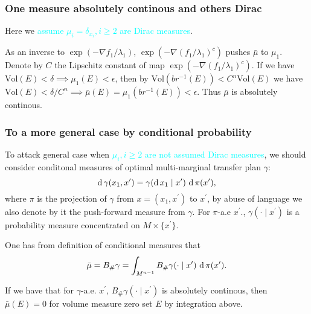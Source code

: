 \subsubsection{One measure absolutely continous and others Dirac}
Here we \textcolor{cyan}{assume $\mu_i = \delta_{x_i}, i \geq 2$ are Dirac measures}.

As an inverse to $\exp(-\nabla f_1/\lambda_1)$,
\(\exp(-\nabla(f_1/\lambda_1)^c)\) pushes $\bar{\mu}$ to $\mu_1$.
Denote by $C$ the Lipschitz constant of map \(\exp(-\nabla(f_1/\lambda_1)^c)\).
If we have $ \text{Vol}(E) < \delta \implies \mu_1(E) < \epsilon$,
then by $\text{Vol}(br^{-1}(E)) < C^n \text{Vol}(E)$
we have $\text{Vol}(E) < \delta / C^n \implies \bar{\mu}(E)=\mu_1(br^{-1}(E)) < \epsilon$.
Thus $\bar{\mu}$ is absolutely continous.


\subsubsection{To a more general case by conditional probability}
To attack general case when \textcolor{cyan}{$\mu_i, i \geq 2$ are not assumed Dirac measures},
we should consider conditonal measures of optimal multi-marginal transfer plan $\gamma$:
\[
	\operatorname{d} \gamma(x_1, x^\prime)= \gamma(\operatorname{d} x_1 \mid x^\prime)\, \operatorname{d} \pi(x^\prime) ,
\]
where $\pi$ is the projection of $\gamma$ from $x = (x_1, x^\prime)$ to $x^\prime$,
by abuse of language we also denote by it the push-forward measure from $\gamma$.
For $\pi$-a.e $x^\prime$., $\gamma(\cdot \mid x^\prime)$ is a probability measure
concentrated on $M \times \{x^\prime\}$.

One has from definition of conditional measures that
\[
	\bar{\mu} = B_{\#} \gamma = \int_{M^{n-1}} B_{\#} \gamma(\cdot \mid x^\prime)\, \operatorname{d} \pi(x^\prime).
\]


If we have that for $\gamma$-a.e. $x^\prime$,
$B_{\#} \gamma(\cdot \mid x^\prime)$
is absolutely continous,
then $\bar{\mu}(E)=0$ for volume measure zero set $E$ by integration above.

